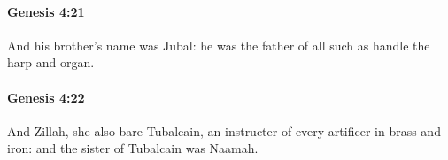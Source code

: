 		\paragraph{Genesis 4:21} %
			\label{GENESIS-4-21}

			And his brother's name was Jubal: he was the father of all such as handle the harp and organ.


		\paragraph{Genesis 4:22} %
			\label{GENESIS-4-22}

			And Zillah, she also bare Tubalcain, an instructer of every artificer in brass and iron: and the sister of Tubalcain was Naamah.


